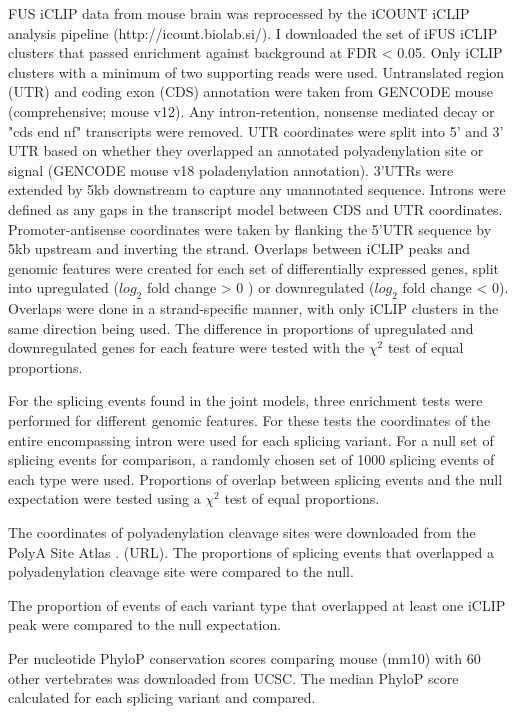 FUS iCLIP data from mouse brain \citep{Rogelj2012} was reprocessed by the iCOUNT iCLIP analysis pipeline (http://icount.biolab.si/). 
I downloaded the set of iFUS iCLIP clusters that passed enrichment against background at FDR < 0.05. 
Only iCLIP clusters with a minimum of two supporting reads were used. 
Untranslated region (UTR) and coding exon (CDS) annotation were taken from GENCODE mouse (comprehensive; mouse v12). Any intron-retention, nonsense mediated decay or "cds end nf" transcripts were removed. 
UTR coordinates were split into 5' and 3' UTR based on whether they overlapped an annotated polyadenylation site or signal (GENCODE mouse v18 poladenylation annotation). 
3'UTRs were extended by 5kb downstream to capture any unannotated sequence.
Introns were defined as any gaps in the transcript model between CDS and UTR coordinates.
Promoter-antisense coordinates were taken by flanking the 5'UTR sequence by 5kb upstream and inverting the strand.
Overlaps between iCLIP peaks and genomic features were created for each set of differentially expressed genes, split into upregulated ($log_2$ fold change > 0 ) or downregulated ($log_2$ fold change < 0). Overlaps were done in a strand-specific manner, with only iCLIP clusters in the same direction being used.
The difference in proportions of upregulated and downregulated genes for each feature were tested with the $\chi^2$ test of equal proportions.

For the splicing events found in the joint models, three enrichment tests were performed for different genomic features. 
For these tests the coordinates of the entire encompassing intron were used for each splicing variant.
For a null set of splicing events for comparison, a randomly chosen set of 1000 splicing events of each type were used.
Proportions of overlap between splicing events and the null expectation were tested using a $\chi^2$ test of equal proportions.

The coordinates of polyadenylation cleavage sites were downloaded from the PolyA Site Atlas \citep{Gruber2016}. (URL). 
The proportions of  splicing events that overlapped a polyadenylation cleavage site were compared to the null.

The proportion of events of each variant type that overlapped at least one iCLIP peak  were compared to the null expectation.

Per nucleotide PhyloP conservation scores \citep{Pollard2010-fj} comparing mouse (mm10) with 60 other vertebrates was downloaded from UCSC. 
The median PhyloP score calculated for each splicing variant and compared.

